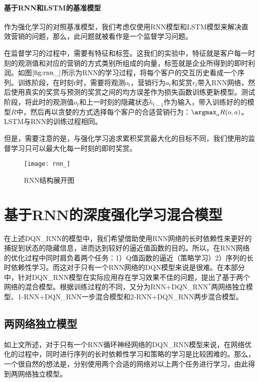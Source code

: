 
 \paragraph{基于RNN和LSTM的基准模型}
 作为强化学习的对照基准模型，我们考虑仅使用RNN模型和LSTM模型来解决直效营销的问题，那么，此问题就被看作是一个监督学习问题。

 在监督学习的过程中，需要有特征和标签。这我们的实验中，特征就是客户每一时刻的观测值和对应的营销的方式类别所组成的向量，标签就是企业所得到的即时利润。如图$\ref{fig:rnn_}$所示为RNN的学习过程，将每个客户的交互历史看成一个序列。训练阶段，在时刻$t$时，需要将观测$o_{t}$，营销行为$a_{t}$和奖赏$r_{t}$带入RNN网络，然后使用真实的奖赏与预测的奖赏之间的均方误差作为损失函数训练更新模型。测试阶段，将此时的观测值$o_{t}$和上一时刻的隐藏状态$\tilde{h}_{t-1}$作为输入，带入训练好的的模型$R$中，然后再以贪婪的方式选择每个客户的合适营销行为：$\argmax_{a}R(o,a)$。LSTM与RNN的训练过程相同。

 但是，需要注意的是，与强化学习追求累积奖赏最大化的目标不同，我们使用的监督学习只可以最大化每一时刻的即时奖赏。

\begin{figure}[htbp]
\centering
\texttt{[image: rnn\_]}
\caption{RNN结构展开图}
\label{fig:rnn_}
\end{figure}

\section{基于RNN的深度强化学习混合模型}
在上述DQN\_RNN的模型中，我们希望借助使用RNN网络的长时依赖性来更好的捕捉到状态的隐藏信息，进而达到较好的逼近值函数的目的。所以，在RNN网络的优化过程中同时肩负着两个任务：1）Q值函数的逼近（策略学习）2）序列的长时依赖性学习。而这对于只有一个RNN网络的DQN模型来说是很难。在本部分中，针对DQN_RNN模型在实际应用存在学习效果不佳的问题，提出了基于两个网络的混合模型。根据训练过程的不同，又分为RNN+DQN_RNN$^{*}$两网络独立模型、1-RNN+DQN_RNN一步混合模型和2-RNN+DQN_RNN两步混合模型。

\subsection{两网络独立模型}
如上文所述，对于只有一个RNN循环神经网络的DQN\_RNN模型来说，在网络优化的过程中，同时进行序列的长时依赖性学习和策略的学习是比较困难的。那么，一个很自然的想法是，分别使用两个合适的网络对以上两个任务进行学习，由此得到两网络独立模型。

